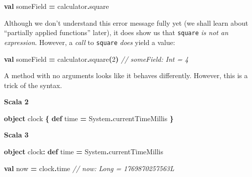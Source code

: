 \documentclass[11pt,a5paper,]{book}
\newenvironment{Shaded}{\begin{snugshade}}{\end{snugshade}}
\newcommand{\CommentTok}[1]{\textcolor[rgb]{0.56,0.35,0.01}{\textit{#1}}}
\newcommand{\DecValTok}[1]{\textcolor[rgb]{0.00,0.00,0.81}{#1}}
\newcommand{\ExtensionTok}[1]{#1}
\newcommand{\FunctionTok}[1]{\textcolor[rgb]{0.00,0.00,0.00}{#1}}
\newcommand{\KeywordTok}[1]{\textcolor[rgb]{0.13,0.29,0.53}{\textbf{#1}}}
\newcommand{\NormalTok}[1]{#1}
\newcommand{\OperatorTok}[1]{\textcolor[rgb]{0.81,0.36,0.00}{\textbf{#1}}}
\begin{document}
\begin{Shaded}
\begin{Highlighting}[]
\KeywordTok{val}\NormalTok{ someField }\OperatorTok{=}\NormalTok{ calculator}\OperatorTok{.}\NormalTok{square}
\end{Highlighting}
\end{Shaded}

Although we don't understand this error message fully yet (we shall
learn about ``partially applied functions'' later), it does show us that
\texttt{square} \emph{is not an expression}. However, a \emph{call} to
\texttt{square} \emph{does} yield a value:

\begin{Shaded}
\begin{Highlighting}[]
\KeywordTok{val}\NormalTok{ someField }\OperatorTok{=}\NormalTok{ calculator}\OperatorTok{.}\FunctionTok{square}\OperatorTok{(}\DecValTok{2}\OperatorTok{)}
\CommentTok{// someField: Int = 4}
\end{Highlighting}
\end{Shaded}

A method with no arguments looks like it behaves differently. However,
this is a trick of the syntax.

\textbf{Scala 2}

\begin{Shaded}
\begin{Highlighting}[]
\KeywordTok{object}\NormalTok{ clock }\OperatorTok{\{}
  \KeywordTok{def}\NormalTok{ time }\OperatorTok{=} \ExtensionTok{System}\OperatorTok{.}\NormalTok{currentTimeMillis}
\OperatorTok{\}}
\end{Highlighting}
\end{Shaded}

\textbf{Scala 3}

\begin{Shaded}
\begin{Highlighting}[]
\KeywordTok{object}\NormalTok{ clock}\OperatorTok{:}
  \KeywordTok{def}\NormalTok{ time }\OperatorTok{=} \ExtensionTok{System}\OperatorTok{.}\NormalTok{currentTimeMillis}
\end{Highlighting}
\end{Shaded}

\begin{Shaded}
\begin{Highlighting}[]
\KeywordTok{val}\NormalTok{ now }\OperatorTok{=}\NormalTok{ clock}\OperatorTok{.}\NormalTok{time}
\CommentTok{// now: Long = 1769870257563L}
\end{Highlighting}
\end{Shaded}
\end{document}
